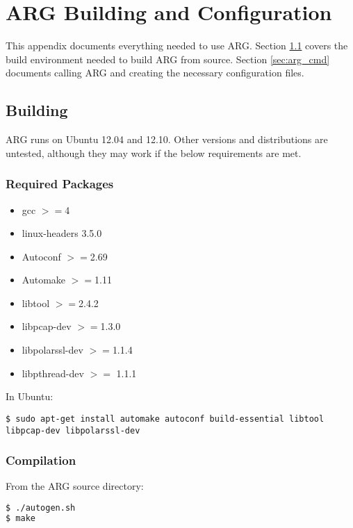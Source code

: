 \chapter{\ac{ARG} Building and Configuration}
\label{chp:argconf}

\par This appendix documents everything needed to use \ac{ARG}. Section \ref{sec:arg_env} covers the build environment needed to build \ac{ARG} from source. Section \ref{sec:arg_cmd} documents calling \ac{ARG} and creating the necessary configuration files.

\section{Building}
\label{sec:arg_env}
\par \ac{ARG} runs on Ubuntu 12.04 and 12.10. Other versions and distributions are untested, although they may work if the below requirements are met. 

\subsection{Required Packages}
{\singlespace
\begin{itemize}
\item gcc $>=$4
\item linux-headers 3.5.0
\item Autoconf $>=$2.69
\item Automake $>=$1.11
\item libtool $>=$2.4.2
\item libpcap-dev $>=$1.3.0
\item libpolarssl-dev $>=$1.1.4
\item libpthread-dev $>=$ 1.1.1 
\end{itemize}
}

\par In Ubuntu:
\begin{lstlisting}
$ sudo apt-get install automake autoconf build-essential libtool libpcap-dev libpolarssl-dev
\end{lstlisting}

\subsection{Compilation}
\par From the \ac{ARG} source directory:
\begin{lstlisting}[language=bash]
$ ./autogen.sh
$ make
\end{lstlisting}

